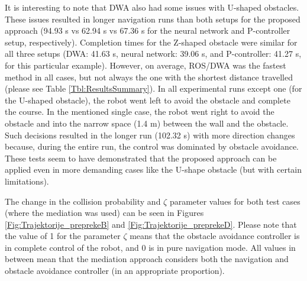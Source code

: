 It is interesting to note that DWA also had some issues with U-shaped obstacles. These issues resulted in longer navigation runs than both setups for the proposed approach (94.93 s vs 62.94 s vs 67.36 s for the neural network and P-controller setup, respectively). Completion times for the Z-shaped obstacle were similar for all three setups (DWA: 41.63 s, neural network: 39.06 s, and P-controller: 41.27 s, for this particular example). However, on average, ROS/DWA was the fastest method in all cases, but not always the one with the shortest distance travelled (please see Table \ref{Tbl:ResultsSummary}). In all experimental runs except one (for the U-shaped obstacle), the robot went left to avoid the obstacle and complete the course. In the mentioned single case, the robot went right to avoid the obstacle and into the narrow space (1.4 m) between the wall and the obstacle. Such decisions resulted in the longer run (102.32 s) with more direction changes because, during the entire run, the control was dominated by obstacle avoidance. These tests seem to have demonstrated that the proposed approach can be applied even in more demanding cases like the U-shape obstacle (but with certain limitations).

The change in the collision probability and $\zeta$ parameter values for both test cases (where the mediation was used) can be seen in Figures \ref{Fig:Trajektorije_preprekeB} and \ref{Fig:Trajektorije_preprekeD}. Please note that the value of 1 for the parameter $\zeta$ means that the obstacle avoidance controller is in complete control of the robot, and 0 is in pure navigation mode. All values in between mean that the mediation approach considers both the navigation and obstacle avoidance controller (in an appropriate proportion).

